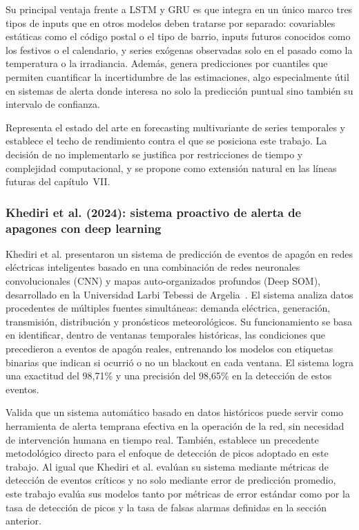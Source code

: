 \documentclass[12pt, a4paper]{article}
\begin{document}
Su principal ventaja frente a LSTM y GRU es que integra en un único marco tres tipos de inputs que en otros modelos deben tratarse por separado: covariables estáticas como el código postal o el tipo de barrio, inputs futuros conocidos como los festivos o el calendario, y series exógenas observadas solo en el pasado como la temperatura o la irradiancia. Además, genera predicciones por cuantiles que permiten cuantificar la incertidumbre de las estimaciones, algo especialmente útil en sistemas de alerta donde interesa no solo la predicción puntual sino también su intervalo de confianza.

Representa el estado del arte en forecasting multivariante de series temporales y establece el techo de rendimiento contra el que se posiciona este trabajo. La decisión de no implementarlo se justifica por restricciones de tiempo y complejidad computacional, y se propone como extensión natural en las líneas futuras del capítulo~VII.

\subsubsection{Khediri et al. (2024): sistema proactivo de alerta de apagones con deep learning}

Khediri et al. presentaron un sistema de predicción de eventos de apagón en redes eléctricas inteligentes basado en una combinación de redes neuronales convolucionales (CNN) y mapas auto-organizados profundos (Deep SOM), desarrollado en la Universidad Larbi Tebessi de Argelia~\cite{khediri2024}. El sistema analiza datos procedentes de múltiples fuentes simultáneas: demanda eléctrica, generación, transmisión, distribución y pronósticos meteorológicos. Su funcionamiento se basa en identificar, dentro de ventanas temporales históricas, las condiciones que precedieron a eventos de apagón reales, entrenando los modelos con etiquetas binarias que indican si ocurrió o no un blackout en cada ventana. El sistema logra una exactitud del 98,71\% y una precisión del 98,65\% en la detección de estos eventos.

Valida que un sistema automático basado en datos históricos puede servir como herramienta de alerta temprana efectiva en la operación de la red, sin necesidad de intervención humana en tiempo real. También, establece un precedente metodológico directo para el enfoque de detección de picos adoptado en este trabajo. Al igual que Khediri et al. evalúan su sistema mediante métricas de detección de eventos críticos y no solo mediante error de predicción promedio, este trabajo evalúa sus modelos tanto por métricas de error estándar como por la tasa de detección de picos y la tasa de falsas alarmas definidas en la sección anterior.
\end{document}
